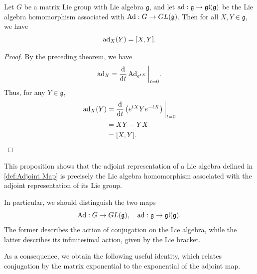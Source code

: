\documentclass[../main.tex]{subfiles}
\begin{document}
\begin{proposition}{}{}
  Let $G$ be a matrix Lie group with Lie algebra $\mathfrak{g}$, and let $\operatorname{ad}:\mathfrak{g}\to\mathfrak{gl}(\mathfrak{g})$ be the Lie algebra homomorphism associated with $\operatorname{Ad}:G\to GL(\mathfrak{g})$. Then for all $X,Y\in\mathfrak{g}$, we have
  \begin{equation}
    \operatorname{ad}_X(Y)=[X,Y].
  \end{equation}
\end{proposition}
\begin{proof}
  By the preceding theorem, we have
  \begin{equation*}
    \operatorname{ad}_X=\frac{\mathrm{d}}{\mathrm{d}t}\operatorname{Ad}_{e^{tX}}\bigg|_{t=0}.
  \end{equation*}
  Thus, for any $Y\in\mathfrak{g}$,
  \begin{equation*}
    \begin{aligned}
      \operatorname{ad}_X(Y)
      &=\frac{\mathrm{d}}{\mathrm{d}t}\left(e^{tX}Ye^{-tX}\right)\bigg|_{t=0}\\
      &=XY-YX\\
      &=[X,Y].
    \end{aligned}
  \end{equation*}
\end{proof}

\begin{remark}
  This proposition shows that the adjoint representation of a Lie algebra defined in \ref{def:Adjoint Map} is precisely the Lie algebra homomorphism associated with the adjoint representation of its Lie group.

  In particular, we should distinguish the two maps
  \begin{equation}
    \operatorname{Ad}:G\to GL(\mathfrak{g}),\quad
    \operatorname{ad}:\mathfrak{g}\to\mathfrak{gl}(\mathfrak{g}).
  \end{equation}
  The former describes the action of conjugation on the Lie algebra, while the latter describes its infinitesimal action, given by the Lie bracket.
\end{remark}

As a consequence, we obtain the following useful identity, which relates conjugation by the matrix exponential to the exponential of the adjoint map.
\end{document}
